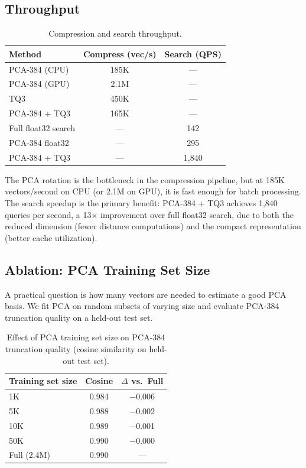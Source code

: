 \documentclass[journal]{IEEEtran}
\begin{document}
\subsection{Throughput}

\begin{table}[t]
  \centering
  \caption{Compression and search throughput.}
  \label{tab:throughput}
  \begin{tabular}{lcc}
    \toprule
    \textbf{Method} & \textbf{Compress (vec/s)} & \textbf{Search (QPS)} \\
    \midrule
    PCA-384 (CPU)       & 185K  & --- \\
    PCA-384 (GPU)       & 2.1M  & --- \\
    TQ3                 & 450K  & --- \\
    PCA-384 + TQ3       & 165K  & --- \\
    \midrule
    Full float32 search & ---   & 142  \\
    PCA-384 float32     & ---   & 295  \\
    PCA-384 + TQ3       & ---   & 1,840 \\
    \bottomrule
  \end{tabular}
\end{table}

The PCA rotation is the bottleneck in the compression pipeline, but at 185K vectors/second on CPU (or 2.1M on GPU), it is fast enough for batch processing.
The search speedup is the primary benefit: PCA-384 + TQ3 achieves 1,840 queries per second, a 13$\times$ improvement over full float32 search, due to both the reduced dimension (fewer distance computations) and the compact representation (better cache utilization).

\subsection{Ablation: PCA Training Set Size}
\label{sec:ablation}

A practical question is how many vectors are needed to estimate a good PCA basis.
We fit PCA on random subsets of varying size and evaluate PCA-384 truncation quality on a held-out test set.

\begin{table}[t]
  \centering
  \caption{Effect of PCA training set size on PCA-384 truncation quality (cosine similarity on held-out test set).}
  \label{tab:pca_size}
  \begin{tabular}{lcc}
    \toprule
    \textbf{Training set size} & \textbf{Cosine} & \textbf{$\Delta$ vs.\ Full} \\
    \midrule
    1K    & 0.984 & $-$0.006 \\
    5K    & 0.988 & $-$0.002 \\
    10K   & 0.989 & $-$0.001 \\
    50K   & 0.990 & $-$0.000 \\
    Full (2.4M) & 0.990 & --- \\
    \bottomrule
  \end{tabular}
\end{table}
\end{document}
